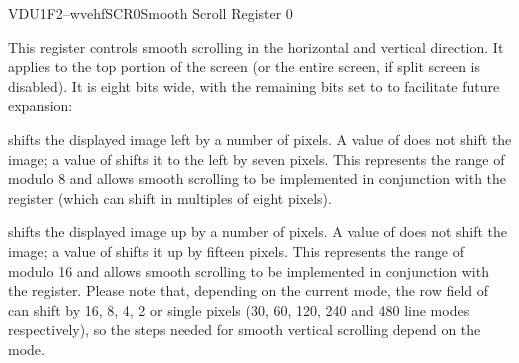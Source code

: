 


\begin{ioport}{VDU}{1F2}{--wvehf}{SCR0}{Smooth Scroll Register 0}

  This register controls smooth scrolling in the horizontal and vertical
  direction. It applies to the top portion of the screen (or the entire screen,
  if split screen is disabled). It is eight bits wide, with the remaining bits
  set to  to facilitate future expansion:

  \begin{bitfield}
  \end{bitfield}

  \begin{description}  shifts the displayed image left by a
    number of pixels. A value of  does not shift the image; a value
    of  shifts it to the left by seven pixels. This represents the range
    of modulo 8 and allows smooth scrolling to be implemented in conjunction
    with the  register (which can shift in multiples of eight
    pixels).

     shifts the displayed image up by a number of
    pixels. A value of  does not shift the image; a value of
     shifts it up by fifteen pixels. This represents the range
    of modulo 16 and allows smooth scrolling to be implemented in
    conjunction with the  register. Please note that,
    depending on the current mode, the row field of  can
    shift by 16, 8, 4, 2 or single pixels (30, 60, 120, 240 and 480
    line modes respectively), so the steps needed for smooth vertical
    scrolling depend on the mode.
  \end{description}

\end{ioport}


